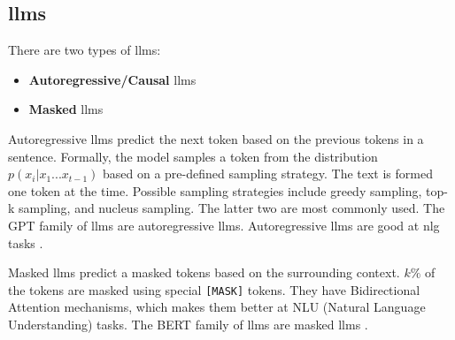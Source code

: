 \subsection{\acp{llm}}
\label{sec:llms}

There are two types of \acp{llm}:
\begin{itemize}
    \item \textbf{Autoregressive/Causal} \acp{llm}
    \item \textbf{Masked} \acp{llm}
\end{itemize}
Autoregressive \acp{llm} predict the next token based on the previous tokens in a sentence. 
Formally, the model samples a token from the distribution $p(x_i | x_1 ... x_{t-1})$ based on a pre-defined sampling strategy.
The text is formed one token at the time.
Possible sampling strategies include greedy sampling, top-k sampling, and nucleus sampling.
The latter two are most commonly used.
The GPT family of \acp{llm} are autoregressive \acp{llm}.
Autoregressive \acp{llm} are good at \ac{nlg} tasks \citep{bhattacharjee_fighting_2024}.

Masked \acp{llm} predict a masked tokens based on the surrounding context.
$k\%$ of the tokens are masked using special \texttt{[MASK]} tokens.
They have Bidirectional Attention mechanisms, which makes them better at NLU (Natural Language Understanding) tasks.
The BERT family of \acp{llm} are masked \acp{llm} \citep{bhattacharjee_fighting_2024}.